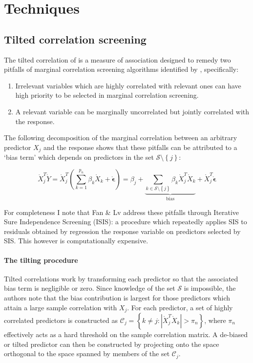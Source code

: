 \documentclass[11pt]{report}\usepackage[utf8]{inputenc}
\begin{document}
\chapter{Techniques} \label{techniques}

\section{Tilted correlation screening}\label{tilting introduction}

The tilted correlation of \cite{cho2012high} is a measure of association designed to remedy two pitfalls of marginal correlation screening algorithms identified by \cite{fan2008sure}, specifically: 

\begin{enumerate}
    \item Irrelevant variables which are highly correlated with relevant ones can have high priority to be selected in marginal correlation screening. 
    \item A relevant variable can be marginally uncorrelated but jointly correlated with the response.
\end{enumerate}

The following decomposition of the marginal correlation between an arbitrary predictor $X_j$ and the response shows that these pitfalls can be attributed to a `bias term' which depends on predictors in the set $\mathcal{S} \setminus \left \{ j \right \}$: 

\begin{equation*}
    \mathring{X}_j^T\mathring{Y} = \mathring{X}_j^T\left ( \sum_{k=1}^{p_n} \beta_k \mathring{X}_k + \mathring{\boldsymbol{\epsilon}}  \right ) = \beta_j + \underbrace{\sum_{k \in \mathcal{S} \setminus \left \{ j \right \}} \beta_k \mathring{X}_j^T\mathring{X}_k}_\text{bias} + \mathring{X}_j^T\mathring{\boldsymbol{\epsilon}} 
\end{equation*}

For completeness I note that Fan \& Lv address these pitfalls through Iterative Sure Independence Screening (ISIS): a procedure which repeatedly applies SIS to residuals obtained by regression the response variable on predictors selected by SIS. This however is computationally expensive. 

\subsubsection{The tilting procedure}

Tilted correlations work by transforming each predictor so that the associated bias term is negligible or zero. Since knowledge of the set $\mathcal{S}$ is impossible, the authors note that the bias contribution is largest for those predictors which attain a large sample correlation with $X_j$. For each predictor, a set of highly correlated predictors is constructed as $\mathcal{C}_{j} = \left \{ k \neq j : \left | \mathring{X}_j^T \mathring{X}_k \right | > \pi_{n}  \right \}$, where $\pi_n$ effectively acts as a hard threshold on the sample correlation matrix. A de-biased or tilted predictor can then be constructed by projecting onto the space orthogonal to the space spanned by members of the set $\mathcal{C}_j$. 
\end{document}
